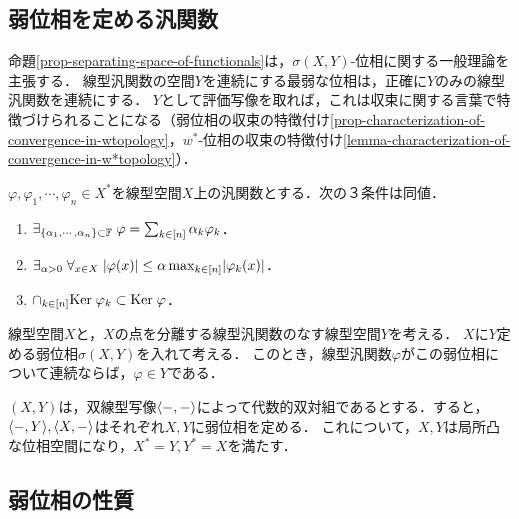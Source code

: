 \documentclass[uplatex,dvipdfmx]{jsreport}
\begin{document}
\subsection{弱位相を定める汎関数}

\begin{tcolorbox}[colframe=ForestGreen, colback=ForestGreen!10!white,breakable,colbacktitle=ForestGreen!40!white,coltitle=black,fonttitle=\bfseries\sffamily,
title=]
    命題\ref{prop-separating-space-of-functionals}は，$\sigma(X,Y)$-位相に関する一般理論を主張する．
    線型汎関数の空間$Y$を連続にする最弱な位相は，正確に$Y$のみの線型汎関数を連続にする．
    $Y$として評価写像を取れば，これは収束に関する言葉で特徴づけられることになる（弱位相の収束の特徴付け\ref{prop-characterization-of-convergence-in-wtopology}，$w^*$-位相の収束の特徴付け\ref{lemma-characterization-of-convergence-in-w*topology}）．
\end{tcolorbox}

\begin{lemma}
    $\varphi,\varphi_1,\cdots,\varphi_n\in X^*$を線型空間$X$上の汎関数とする．次の３条件は同値．
    \begin{enumerate}
        \item $\exists_{\left\{\alpha_1,\cdots,\alpha_n\right\}\subset\mathbb{F}}\;\varphi=\sum_{k\in[n]}\alpha_k\varphi_k$．
        \item $\exists_{\alpha>0}\;\forall_{x\in X}\;\lvert\varphi(x)\rvert\le\alpha\max_{k\in[n]}\lvert\varphi_k(x)\rvert$．
        \item $\cap_{k\in[n]}\mathrm{Ker}\;\varphi_k\subset\mathrm{Ker}\;\varphi$．
    \end{enumerate}
\end{lemma}

\begin{proposition}\label{prop-separating-space-of-functionals}
    線型空間$X$と，$X$の点を分離する線型汎関数のなす線型空間$Y$を考える．
    $X$に$Y$定める弱位相$\sigma(X,Y)$を入れて考える．
    このとき，線型汎関数$\varphi$がこの弱位相について連続ならば，$\varphi\in Y$である．
\end{proposition}
\begin{corollary}
    $(X,Y)$は，双線型写像$\langle-,-\rangle$によって代数的双対組であるとする．すると，$\langle-,Y\rangle,\langle X,-\rangle$はそれぞれ$X,Y$に弱位相を定める．
    これについて，$X,Y$は局所凸な位相空間になり，$X^*=Y,Y^*=X$を満たす．
\end{corollary}

\subsection{弱位相の性質}
\end{document}
